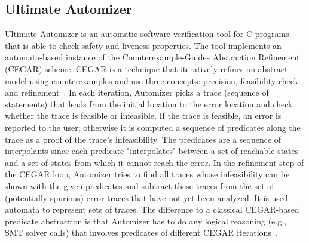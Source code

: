 \documentclass[10pt,conference]{IEEEtran}
\begin{document}
\subsection{Ultimate Automizer}
Ultimate Automizer is an automatic software verification tool for C programs that is able to check safety and liveness properties. The tool implements an automata-based instance of the Counterexample-Guides Abstraction Refinement (CEGAR) scheme. CEGAR is a technique that iteratively refines an abstract model using counterexamples and use three concepts: precision, feasibility check and refinement~\cite{CEGAR}. In each iteration, Automizer picks a trace (sequence of statements) that leads from the initial location to the error location and check whether the trace is feasible or infeasible. If the trace is feasible, an error is reported to the user; otherwise it is computed a sequence of predicates along the trace as a proof of the trace's infeasibility. The predicates are a sequence of interpolants since each predicate "interpolates" between a set of reachable states and a set of states from which it cannot reach the error. In the refinement step of the CEGAR loop, Automizer tries to find all traces whose infeasibility can be shown with the given predicates and subtract these traces from the set of (potentially spurious) error traces that have not yet been analyzed. It is used automata to represent sets of traces. The difference to a classical CEGAR-based predicate abstraction is that Automizer has to do any logical reasoning (e.g., SMT solver calls) that involves predicates of different CEGAR iterations~\cite{Automizer2018}. 

\end{document}
